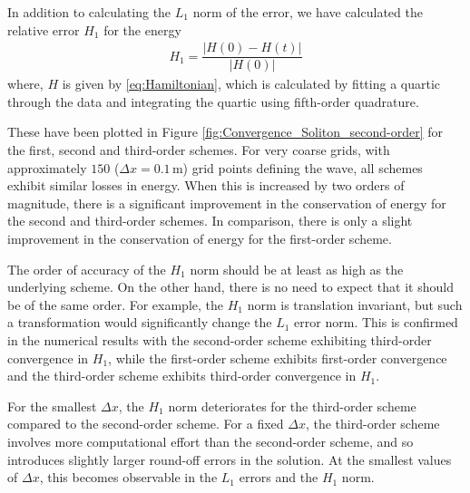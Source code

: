 \documentclass[preprint,sort&compress,1p]{article}
\begin{document}
In addition to calculating the $L_1$ norm of the error, we have calculated the relative error $H_1$  for the energy
\begin{gather}
H_1 = \dfrac{|H(0) - H(t)|}{|H(0)|}
\label{eq:H1_norm}
\end{gather}
where, $H$ is given by \eqref{eq:Hamiltonian}, which is calculated by fitting a quartic through the data and integrating the quartic using fifth-order quadrature.

These have been plotted in Figure \ref{fig:Convergence_Soliton_second-order} for the first, second and third-order schemes. For very coarse grids, with approximately $150$ ($\Delta x = 0.1$\,m) grid points defining the wave, all schemes exhibit similar losses in energy. When this is increased by two orders of magnitude, there is a significant improvement in the conservation of energy for the second and third-order schemes. In comparison, there is only a slight improvement in the conservation of energy for the first-order scheme.

The order of accuracy of the $H_1$ norm should be at least as  high as the underlying scheme. On the other hand, there is no need to expect that it should be of the same order. For example, the $H_1$ norm is translation invariant, but such a transformation would significantly change the $L_1$ error norm. This is confirmed in the numerical results with the second-order scheme exhibiting third-order convergence in $H_1$, while the first-order scheme exhibits first-order convergence and the third-order scheme exhibits third-order convergence in $H_1$.

For the smallest $\Delta x$, the $H_1$ norm deteriorates for the third-order scheme compared to the second-order scheme. For a fixed $\Delta x$, the third-order scheme involves more computational effort than the second-order scheme, and so introduces slightly larger round-off errors in the solution. At the smallest values of $\Delta x$, this becomes observable in the $L_1$ errors and the $H_1$ norm.
\end{document}
